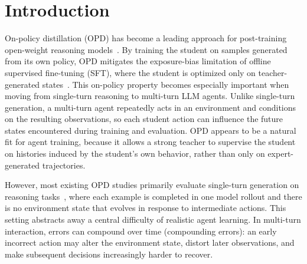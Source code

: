 \section{Introduction}
\label{sec:introduction}

On-policy distillation (OPD) has become a leading approach for post-training open-weight reasoning models~\citep{agarwal2024policy, lu2025onpolicydistillation, song2026survey, zhou2026omniopd}.
%
By training the student on samples generated from its own policy, OPD mitigates the exposure-bias limitation of offline supervised fine-tuning (SFT), where the student is optimized only on teacher-generated states~\citep{zhou2025mixture, hao2026self}.
%
This on-policy property becomes especially important when moving from single-turn reasoning to multi-turn LLM agents.
%
Unlike single-turn generation, a multi-turn agent repeatedly acts in an environment and conditions on the resulting observations, so each student action can influence the future states encountered during training and evaluation.
%
OPD appears to be a natural fit for agent training, because it allows a strong teacher to supervise the student on histories induced by the student's own behavior, rather than only on expert-generated trajectories.
%

However, most existing OPD studies primarily evaluate single-turn generation on reasoning tasks~\citep{yang2026learning, jin2026entropy}, where each example is completed in one model rollout and there is no environment state that evolves in response to intermediate actions.
%
This setting abstracts away a central difficulty of realistic agent learning.
%
In multi-turn interaction, errors can compound over time (compounding errors): an early incorrect action may alter the environment state, distort later observations, and make subsequent decisions increasingly harder to recover.

